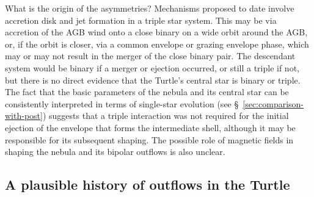 \documentclass[useAMS, usenatbib]{mnras}
\begin{document}
What is the origin of the asymmetries?
Mechanisms proposed to date \citep{Soker:2004b, Soker:2016b}
involve accretion disk and jet formation in a triple star system.
This may be via accretion of the AGB wind onto a close binary on a wide orbit around the AGB,
or, if the orbit is closer, via a common envelope or grazing envelope phase,
which may or may not result in the merger of the close binary pair.
The descendant system would be binary if a merger or ejection occurred,
or still a triple if not,
but there is no direct evidence that the Turtle's central star is binary or triple.
The fact that the basic parameters of the nebula and its central star can be consistently interpreted in terms of single-star evolution (see \S~\ref{sec:comparison-with-post})
suggests that a triple interaction was not required for the initial ejection of the envelope that forms the intermediate shell,
although it may be responsible for its subsequent shaping.
The possible role of magnetic fields in shaping the nebula and its bipolar outflows
\citep{Garcia-Segura:2000a}
is also unclear.

\subsection{A plausible history of outflows in the Turtle}
\label{sec:poss-hist-outfl}
\end{document}

